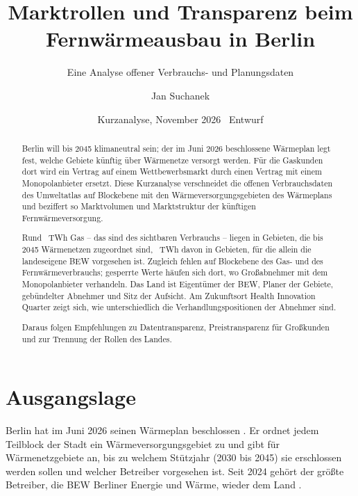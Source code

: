 \documentclass[11pt,DIV=13,a4paper,parskip=half,abstract=true,ngerman]{scrartcl}
\title{Marktrollen und Transparenz beim Fernwärmeausbau in Berlin}
\subtitle{Eine Analyse offener Verbrauchs- und Planungsdaten}
\author{Jan Suchanek}
\date{Kurzanalyse, November 2026 \textbullet\ Entwurf}
\begin{document}
\maketitle

\begin{abstract}
    \setlength{\parindent}{0pt}\setlength{\parskip}{0.5\baselineskip}
    Berlin will bis 2045 klimaneutral sein; der im Juni 2026 beschlossene Wärmeplan legt fest, welche Gebiete künftig über Wärmenetze versorgt werden.
    Für die Gaskunden dort wird ein Vertrag auf einem Wettbewerbsmarkt durch einen Vertrag mit einem Monopolanbieter ersetzt.
    Diese Kurzanalyse verschneidet die offenen Verbrauchsdaten des Umweltatlas auf Blockebene mit den Wärmeversorgungsgebieten des Wärmeplans und beziffert so Marktvolumen und Marktstruktur der künftigen Fernwärmeversorgung.

    Rund \zkonum{\gasnetz}~TWh Gas -- das sind \zkoshare{\gasnetz}{\gasblock} des sichtbaren Verbrauchs -- liegen in Gebieten, die bis 2045 Wärmenetzen zugeordnet sind, \zkonum{\gasbew}~TWh davon in Gebieten, für die allein die landeseigene BEW vorgesehen ist.
    Zugleich fehlen auf Blockebene \zkoshare{\gasbez-\gasblock}{\gasbez} des Gas- und \zkoshare{\fwbez-\fwblock}{\fwbez} des Fernwärmeverbrauchs; gesperrte Werte häufen sich dort, wo Großabnehmer mit dem Monopolanbieter verhandeln.
    Das Land ist Eigentümer der BEW, Planer der Gebiete, gebündelter Abnehmer und Sitz der Aufsicht.
    Am Zukunftsort Health Innovation Quarter zeigt sich, wie unterschiedlich die Verhandlungspositionen der Abnehmer sind.

    Daraus folgen Empfehlungen zu Datentransparenz, Preistransparenz für Großkunden und zur Trennung der Rollen des Landes.
\end{abstract}
    



\tableofcontents

\section{Ausgangslage}

Berlin hat im Juni 2026 seinen Wärmeplan beschlossen \parencite{senat2026waermeplan}.
Er ordnet jedem Teilblock der Stadt ein Wärmeversorgungsgebiet zu und gibt für Wärmenetzgebiete an, bis zu welchem Stützjahr (2030 bis 2045) sie erschlossen werden sollen und welcher Betreiber vorgesehen ist.
Seit 2024 gehört der größte Betreiber, die BEW Berliner Energie und Wärme, wieder dem Land \parencite{senat2024bew}.
\end{document}
